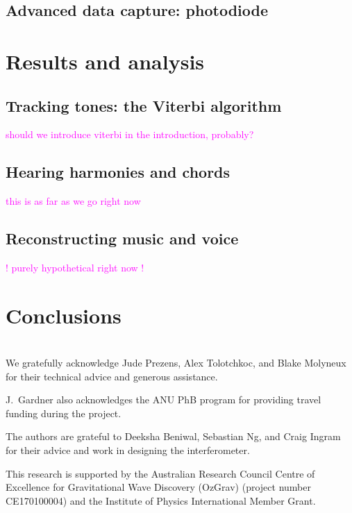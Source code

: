 \documentclass[prb,preprint]{revtex4-1}
\newcommand{\jam}{\textcolor{magenta}}
\begin{document}
\subsection{Advanced data capture: photodiode}


\section{Results and analysis}

\subsection{Tracking tones: the Viterbi algorithm}
\jam{should we introduce viterbi in the introduction, probably?}

\subsection{Hearing harmonies and chords}
\jam{this is as far as we go right now}

\subsection{Reconstructing music and voice}
\jam{! purely hypothetical right now !}


\section{Conclusions}


\appendix
\section{}


\begin{acknowledgments}
We gratefully acknowledge Jude Prezens, Alex Tolotchkoc, and Blake Molyneux for their technical advice and generous assistance.

J.~Gardner also acknowledges the ANU PhB program for providing travel funding during the project.

The authors are grateful to Deeksha Beniwal, Sebastian Ng, and Craig Ingram for their advice and work in designing the interferometer. 

This research is supported by the Australian Research Council Centre of Excellence for Gravitational Wave Discovery (OzGrav) (project number CE170100004) and the Institute of Physics International Member Grant.



\end{acknowledgments}




\end{document}
